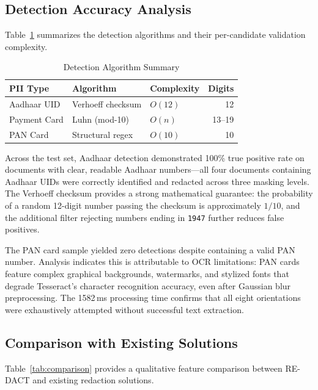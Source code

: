 \documentclass[conference]{IEEEtran}
\begin{document}
\subsection{Detection Accuracy Analysis}
Table~\ref{tab:algorithm_summary} summarizes the detection algorithms and their per-candidate validation complexity.

\begin{table}[htbp]
\caption{Detection Algorithm Summary}
\label{tab:algorithm_summary}
\centering
\begin{tabular}{@{}lllr@{}}
\toprule
\textbf{PII Type} & \textbf{Algorithm} & \textbf{Complexity} & \textbf{Digits} \\
\midrule
Aadhaar UID    & Verhoeff checksum  & $O(12)$   & 12 \\
Payment Card   & Luhn (mod-10)      & $O(n)$    & 13--19 \\
PAN Card       & Structural regex   & $O(10)$   & 10 \\
\bottomrule
\end{tabular}
\end{table}

Across the test set, Aadhaar detection demonstrated 100\% true positive rate on documents with clear, readable Aadhaar numbers---all four documents containing Aadhaar UIDs were correctly identified and redacted across three masking levels. The Verhoeff checksum provides a strong mathematical guarantee: the probability of a random 12-digit number passing the checksum is approximately $1/10$, and the additional filter rejecting numbers ending in \texttt{1947} further reduces false positives.

The PAN card sample yielded zero detections despite containing a valid PAN number. Analysis indicates this is attributable to OCR limitations: PAN cards feature complex graphical backgrounds, watermarks, and stylized fonts that degrade Tesseract's character recognition accuracy, even after Gaussian blur preprocessing. The 1582\,ms processing time confirms that all eight orientations were exhaustively attempted without successful text extraction.

\subsection{Comparison with Existing Solutions}
Table~\ref{tab:comparison} provides a qualitative feature comparison between RE-DACT and existing redaction solutions.
\end{document}
